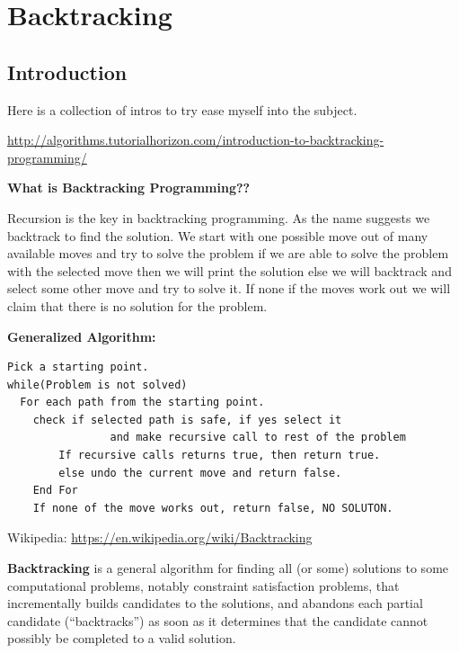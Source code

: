\chapter[Backtracking]
{Backtracking
  \label{chBcktrcking}}


\section{Introduction\label{BktrckIntro}}

Here is a collection of intros to try ease myself into the subject.



\rrsepline


\url{http://algorithms.tutorialhorizon.com/introduction-to-backtracking-programming/}


\noindent{}\textbf{What is Backtracking Programming??}

Recursion is the key in backtracking programming. As the name suggests we
back­track to find the solution. We start with one possible move out of many
available moves and try to solve the problem if we are able to solve the
problem with the selected move then we will print the solution else we will
back­track and select some other move and try to solve it. If none if the
moves work out we will claim that there is no solution for the problem.

\noindent{}\textbf{Generalized Algorithm:}
\begin{lstlisting}[style=pseudostyle,numbers=none]
Pick a starting point.
while(Problem is not solved)
  For each path from the starting point.
    check if selected path is safe, if yes select it
                and make recursive call to rest of the problem
		If recursive calls returns true, then return true.
		else undo the current move and return false.
	End For
	If none of the move works out, return false, NO SOLUTON.
\end{lstlisting}


\rrsepline

Wikipedia: \url{https://en.wikipedia.org/wiki/Backtracking}

\textbf{Backtracking} is a general algorithm for finding all (or some)
solutions to some computational problems, notably constraint satisfaction
problems, that incrementally builds candidates to the solutions, and
abandons each partial candidate (``backtracks'') as soon as it determines
that the candidate cannot possibly be completed to a valid solution.

